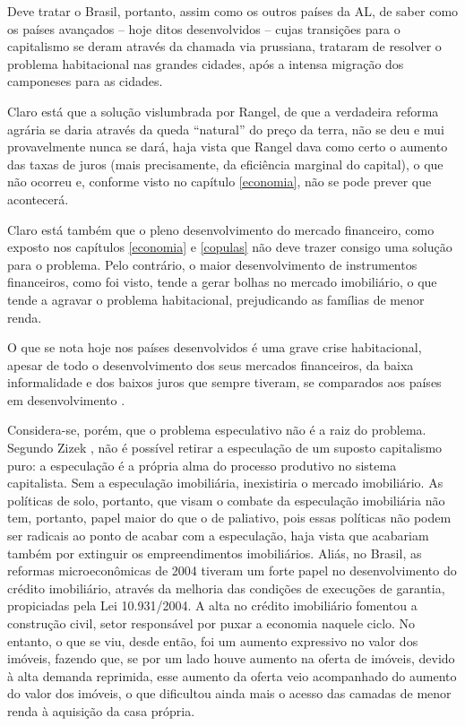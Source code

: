 \documentclass[
	12pt,				%
	oneside,			%
	a4paper,			%
	chapter=TITLE,		%
	section=TITLE,		%
	english,			%
	brazil				%
	]{abntex2}
\begin{document}
Deve tratar o Brasil, portanto, assim como os outros países da \gls{AL},
de saber como os países avançados -- hoje ditos desenvolvidos -- cujas
transições para o capitalismo se deram através da chamada via prussiana,
trataram de resolver o problema habitacional nas grandes cidades, após a intensa
migração dos camponeses para as cidades.

Claro está que a solução vislumbrada por Rangel, de que a verdadeira reforma
agrária se daria através da queda ``natural'' do preço da terra, não se deu e mui
provavelmente nunca se dará, haja vista que Rangel dava como certo o aumento das
taxas de juros (mais precisamente, da eficiência marginal do capital), o que não
ocorreu e, conforme visto no capítulo \ref{economia}, não se pode prever que
acontecerá.

Claro está também que o pleno desenvolvimento do mercado financeiro, como
exposto nos capítulos \ref{economia} e \ref{copulas} não deve trazer consigo
uma solução para o problema. Pelo contrário, o maior desenvolvimento de
instrumentos financeiros, como foi visto, tende a gerar bolhas no mercado
imobiliário, o que tende a agravar o problema habitacional, prejudicando as
famílias de menor renda.

O que se nota hoje nos países desenvolvidos é uma grave crise habitacional,
apesar de todo o desenvolvimento dos seus mercados financeiros, da baixa
informalidade e dos baixos juros que sempre tiveram, se comparados aos países em
desenvolvimento \autocite{housing-europe,california}.

Considera-se, porém, que o problema especulativo não é a raiz do problema.
Segundo Zizek \autocite*[220-221]{zizek2005}, não é possível retirar a especulação de um
suposto capitalismo puro: a especulação é a própria alma do processo produtivo
no sistema capitalista. Sem a especulação imobiliária, inexistiria o mercado
imobiliário. As políticas de solo, portanto, que visam o combate da especulação
imobiliária não tem, portanto, papel maior do que o de paliativo, pois essas
políticas não podem ser radicais ao ponto de acabar com a especulação, haja
vista que acabariam também por extinguir os empreendimentos imobiliários. Aliás,
no Brasil, as reformas microeconômicas de 2004 tiveram um forte papel no
desenvolvimento do crédito imobiliário, através da melhoria das condições de
execuções de garantia, propiciadas pela Lei 10.931/2004. A alta no crédito
imobiliário fomentou a construção civil, setor responsável por puxar a economia
naquele ciclo. No entanto, o que se viu, desde então, foi um aumento expressivo
no valor dos imóveis, fazendo que, se por um lado houve aumento na oferta de
imóveis, devido à alta demanda reprimida, esse aumento da oferta veio
acompanhado do aumento do valor dos imóveis, o que dificultou ainda mais o
acesso das camadas de menor renda à aquisição da casa própria.
\end{document}
